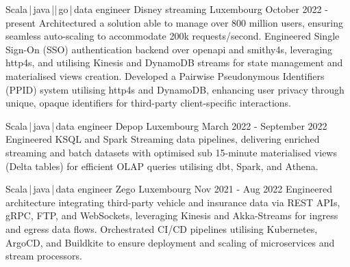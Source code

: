 
\newcommand*{\logo}[2]{\raisebox{-0.2em}{\texttt{[image: \#2]}}\hspace{0.25em}#1}
\newcommand*{\logoonly}[1]{\raisebox{-0.2em}{\texttt{[image: \#1]}}}


\begin{cventries}
  \cventry
    {Scala\,|\,java\,||\,go\,|\,data engineer}
    {\logo{Disney streaming}{../../../images/disney.png}} %
    {Luxembourg} %
    {October 2022 - present} %
    {
      Architectured a solution able to manage over 800 million users, ensuring seamless auto-scaling to accommodate 200k requests/second. Engineered Single Sign-On (SSO) authentication backend over openapi and smithy4s, leveraging http4s, and utilising Kinesis and DynamoDB streams for state management and materialised views creation. 
      \newline
      Developed a Pairwise Pseudonymous Identifiers (PPID) system utilising http4s and DynamoDB, enhancing user privacy through unique, opaque identifiers for third-party client-specific interactions.
    }

  \cventry
    {Scala\,|\,java\,|\,data engineer}
    {\logo{Depop}{../../../images/depop.jpg}} %
    {Luxembourg} %
    {March 2022 - September 2022} %
    {
       Engineered KSQL and Spark Streaming data pipelines, delivering enriched streaming and batch datasets with optimised sub 15-minute materialised views (Delta tables) for efficient OLAP queries utilising dbt, Spark, and Athena.
    }


  \cventry
    {Scala\,|\,java\,|\,data engineer}
    {\logo{Zego}{../../../images/zego.jpg}} %
    {Luxembourg} %
    {Nov 2021 - Aug 2022} %
    {
     Engineered architecture integrating third-party vehicle and insurance data via REST APIs, gRPC, FTP, and WebSockets, leveraging Kinesis and Akka-Streams for ingress and egress data flows. Orchestrated CI/CD pipelines utilising Kubernetes, ArgoCD, and Buildkite to ensure deployment and scaling of microservices and stream processors.
    }


\end{cventries}
